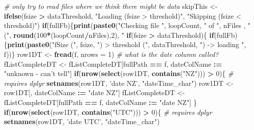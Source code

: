 \documentclass[]{article}
\newenvironment{Shaded}{\begin{snugshade}}{\end{snugshade}}
\newcommand{\KeywordTok}[1]{\textcolor[rgb]{0.13,0.29,0.53}{\textbf{#1}}}
\newcommand{\DataTypeTok}[1]{\textcolor[rgb]{0.13,0.29,0.53}{#1}}
\newcommand{\DecValTok}[1]{\textcolor[rgb]{0.00,0.00,0.81}{#1}}
\newcommand{\StringTok}[1]{\textcolor[rgb]{0.31,0.60,0.02}{#1}}
\newcommand{\CommentTok}[1]{\textcolor[rgb]{0.56,0.35,0.01}{\textit{#1}}}
\newcommand{\ControlFlowTok}[1]{\textcolor[rgb]{0.13,0.29,0.53}{\textbf{#1}}}
\newcommand{\OperatorTok}[1]{\textcolor[rgb]{0.81,0.36,0.00}{\textbf{#1}}}
\newcommand{\ErrorTok}[1]{\textcolor[rgb]{0.64,0.00,0.00}{\textbf{#1}}}
\newcommand{\NormalTok}[1]{#1}
\begin{document}
\begin{Shaded}
\begin{Highlighting}[]
    \CommentTok{# only try to read files where we think there might be data}
\NormalTok{    skipThis <-}\StringTok{ }\KeywordTok{ifelse}\NormalTok{(fsize }\OperatorTok{>}\StringTok{ }\NormalTok{dataThreshold, }\StringTok{"Loading (fsize > threshold)"}\NormalTok{, }\StringTok{"Skipping (fsize < threshold)"}\NormalTok{)}
    \ControlFlowTok{if}\NormalTok{(fullFb)\{}\KeywordTok{print}\NormalTok{(}\KeywordTok{paste0}\NormalTok{(}\StringTok{"Checking file "}\NormalTok{, loopCount, }\StringTok{" of "}\NormalTok{, nFiles ,}
                            \StringTok{" ("}\NormalTok{, }\KeywordTok{round}\NormalTok{(}\DecValTok{100}\OperatorTok{*}\NormalTok{(loopCount}\OperatorTok{/}\NormalTok{nFiles),}\DecValTok{2}\NormalTok{), }\StringTok{"%
    \ControlFlowTok{if}\NormalTok{(fsize }\OperatorTok{>}\StringTok{ }\NormalTok{dataThreshold)\{}
      \ControlFlowTok{if}\NormalTok{(fullFb)\{}\KeywordTok{print}\NormalTok{(}\KeywordTok{paste0}\NormalTok{(}\StringTok{"fSize ("}\NormalTok{, fsize, }\StringTok{") > threshold ("}\NormalTok{, dataThreshold, }\StringTok{") -> loading "}\NormalTok{, f))\}}
\NormalTok{      row1DT <-}\StringTok{ }\KeywordTok{fread}\NormalTok{(f, }\DataTypeTok{nrows =} \DecValTok{1}\NormalTok{)}
      \CommentTok{# what is the date column called?}
\NormalTok{      fListCompleteDT <-}\StringTok{ }\NormalTok{fListCompleteDT[fullPath }\OperatorTok{==}\StringTok{ }\NormalTok{f, dateColName }\OperatorTok{:}\ErrorTok{=}\StringTok{ "unknown - can't tell"}\NormalTok{]}
      \ControlFlowTok{if}\NormalTok{(}\KeywordTok{nrow}\NormalTok{(}\KeywordTok{select}\NormalTok{(row1DT, }\KeywordTok{contains}\NormalTok{(}\StringTok{"NZ"}\NormalTok{))) }\OperatorTok{>}\StringTok{ }\DecValTok{0}\NormalTok{)\{ }\CommentTok{# requires dplyr}
        \KeywordTok{setnames}\NormalTok{(row1DT, }\StringTok{'date NZ'}\NormalTok{, }\StringTok{"dateTime_char"}\NormalTok{)}
\NormalTok{        row1DT <-}\StringTok{ }\NormalTok{row1DT[, dateColName }\OperatorTok{:}\ErrorTok{=}\StringTok{ "date NZ"}\NormalTok{]}
\NormalTok{        fListCompleteDT <-}\StringTok{ }\NormalTok{fListCompleteDT[fullPath }\OperatorTok{==}\StringTok{ }\NormalTok{f, dateColName }\OperatorTok{:}\ErrorTok{=}\StringTok{ "date NZ"}\NormalTok{]}
\NormalTok{      \} }
      \ControlFlowTok{if}\NormalTok{(}\KeywordTok{nrow}\NormalTok{(}\KeywordTok{select}\NormalTok{(row1DT, }\KeywordTok{contains}\NormalTok{(}\StringTok{"UTC"}\NormalTok{))) }\OperatorTok{>}\StringTok{ }\DecValTok{0}\NormalTok{)\{ }\CommentTok{# requires dplyr}
        \KeywordTok{setnames}\NormalTok{(row1DT, }\StringTok{'date UTC'}\NormalTok{, }\StringTok{"dateTime_char"}\NormalTok{)}
}
\end{Highlighting}
\end{Shaded}
\end{document}
